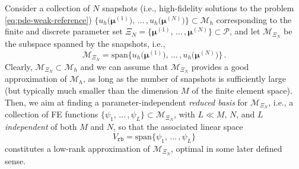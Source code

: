 \documentclass[12pt, a4paper, twoside, openright, notitlepage]{report}
\numberwithin{equation}{chapter}
\theoremstyle{theorem}
\theoremstyle{definition}
\theoremstyle{remark}
\theoremstyle{proposition}
\numberwithin{figure}{chapter}
\newcommand{\bg}[1]{\boldsymbol{#1}}
\begin{document}
		\algrenewcommand\textproc{\textsc}
				
		Consider a collection of $N$ snapshots (i.e., high-fidelity solutions to the problem \eqref{eq:pde-weak-reference}) $\big\lbrace u_h \big( \bg{\mu}^{(1)} \big), \, \ldots \, , u_h \big( \bg{\mu}^{(N)} \big) \big\rbrace \subset \mathcal{M}_h$ corresponding to the finite and discrete parameter set $\Xi_N = \big\lbrace \bg{\mu}^{(1)}, \, \ldots \, , \bg{\mu}^{(N)} \big\rbrace \subset \mathcal{P}$, and let $\mathcal{M}_{\Xi_N}$ be the subspace spanned by the snapshots, i.e.,
		\begin{equation*}
			\mathcal{M}_{\Xi_N} = \text{span} \big\lbrace u_h \big( \bg{\mu}^{(1)}), \, \ldots \, , u_h(\bg{\mu}^{(N)} \big) \big\rbrace \, .
		\end{equation*}
		Clearly, $\mathcal{M}_{\Xi_N} \subset \mathcal{M}_h$ and we can assume that $\mathcal{M}_{\Xi_N}$ provides a good approximation of $\mathcal{M}_h$, as long as the number of snapshots is sufficiently large (but typically much smaller than the dimension $M$ of the finite element space). Then, we aim at finding a parameter-independent \emph{reduced basis} for $\mathcal{M}_{\Xi_N}$, i.e., a collection of FE functions $\big\lbrace \psi_1, \, \ldots \, , \psi_L \big\rbrace \subset \mathcal{M}_{\Xi_N}$, with $L \ll M, \, N$, and $L$ \emph{independent} of both $M$ and $N$, so that the associated linear space 
		\begin{equation*}
			V_{\texttt{rb}} = \text{span} \big\lbrace \psi_1, \, \ldots \, , \psi_L \big\rbrace
		\end{equation*}
		constitutes a low-rank approximation of $\mathcal{M}_{\Xi_N}$, optimal in some later defined sense.
		
\end{document}
